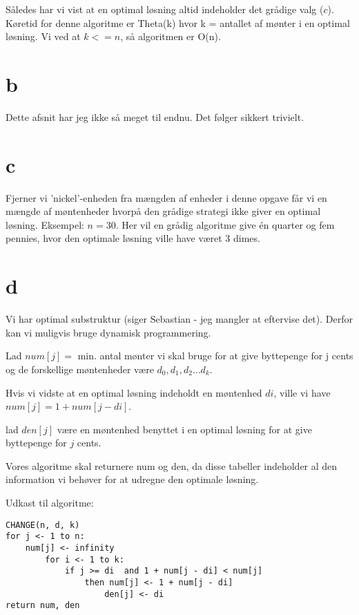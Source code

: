 \documentclass[10pt,a4paper,danish]{article}
\begin{document}
Således har vi vist at en optimal løsning altid indeholder det grådige valg ($c$). Køretid for denne
algoritme er Theta(k) hvor k = antallet af mønter i en optimal løsning. Vi ved at $k <= n$, så algoritmen
er O(n). 

\section{b}
Dette afsnit har jeg ikke så meget til endnu. Det følger sikkert trivielt. 

\section{c}
Fjerner vi 'nickel'-enheden fra mængden af enheder i denne opgave får vi en mængde af møntenheder
hvorpå den grådige strategi ikke giver en optimal løsning. Eksempel: $n = 30$. Her vil en grådig
algoritme give én quarter og fem pennies, hvor den optimale løsning ville have været 3 dimes. 

\section{d}
Vi har optimal substruktur (siger Sebastian - jeg mangler at eftervise det). Derfor kan vi muligvis
bruge dynamisk programmering. 

Lad $num[j] =$ min. antal mønter vi skal bruge for at give byttepenge for j cents og de forskellige 
møntenheder være $d_0, d_1, d_2 \ldots d_k$. 

Hvis vi vidste at en optimal løsning indeholdt en møntenhed $di$, ville vi have 
$num[j] = 1 + num[j - di]$. 

lad $den[j]$ være en møntenhed benyttet i en optimal løsning for at give byttepenge for $j$ cents. 

Vores algoritme skal returnere num og den, da disse tabeller indeholder al den information vi 
behøver for at udregne den optimale løsning. 

Udkast til algoritme: 
\begin{verbatim}
CHANGE(n, d, k)
for j <- 1 to n: 
	num[j] <- infinity
		for i <- 1 to k: 
			if j >= di  and 1 + num[j - di] < num[j]
				then num[j] <- 1 + num[j - di]
					den[j] <- di 
return num, den
\end{verbatim}











 





 
\end{document}
